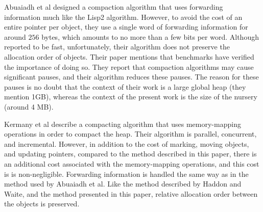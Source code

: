 Abuaiadh et al \cite{Abuaiadh:2004:EPH:1028976.1028995} designed a
compaction algorithm that uses forwarding information much like the
Lisp2 algorithm.  However, to avoid the cost of an entire pointer per
object, they use a single word of forwarding information for around
$256$ bytes, which amounts to no more than a few bits per word.
Although reported to be fast, unfortunately, their algorithm does not
preserve the allocation order of objects.  Their paper mentions that
benchmarks have verified the importance of doing so.  They report that
compaction algorithms may cause significant pauses, and their
algorithm reduces these pauses.  The reason for these pauses is no
doubt that the context of their work is a large global heap (they
mention 1GB), whereas the context of the present work is the size of
the nursery (around 4 MB).

Kermany et al \cite{Kermany:2006:CCI:1133981.1134023} describe a
compacting algorithm that uses memory-mapping operations in order to
compact the heap.  Their algorithm is parallel, concurrent, and
incremental.  However, in addition to the cost of marking, moving
objects, and updating pointers, compared to the method described in
this paper, there is an additional cost associated with the
memory-mapping operations, and this cost is is non-negligible.
Forwarding information is handled the same way as in the method used
by Abuaiadh et al.  Like the method described by Haddon and Waite, and
the method presented in this paper, relative allocation order between
the objects is preserved.
